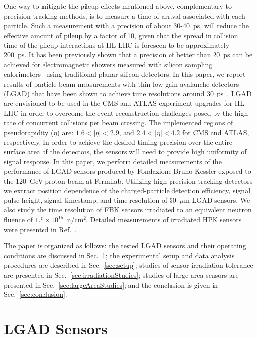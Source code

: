 \documentclass[preprint,1p]{elsarticle}
\begin{document}
One way to mitigate the pileup effects mentioned above, complementary to
precision tracking methods, is to measure a time of arrival 
associated with each particle. Such a measurement with a precision of about
30-40~\si{ps}, will reduce the effective amount of pileup by a factor of 10,
given that the spread in collision time of the pileup interactions at HL-LHC is
foreseen to be approximately 200~\si{ps}. It has been previously shown that a
precision of better than $20$~\si{ps} can be achieved for electromagnetic
showers measured with silicon sampling
calorimeters~\cite{Apresyan201662,Apresyan2017_NSSMIC,AKCHURIN201731} using
traditional planar silicon detectors. In this paper, we report results of
particle beam measurements with thin low-gain avalanche detectors (LGAD) that
have been shown to achieve time resolutions around
30~\si{ps}~\cite{Cartiglia201783, PELLEGRINI201412}. LGAD are envisioned to be
used in the CMS and ATLAS experiment upgrades for HL-LHC in order to overcome
the event reconstruction challenges posed by the high rate of concurrent
collisions per beam crossing. The implemented regions of pseudorapidity ($\eta$)
are: $1.6 < |\eta| < 2.9$, and $2.4 < |\eta| < 4.2 $ for CMS and ATLAS, respectively. In
order to achieve the desired timing precision over the entire surface area of the
detectors, the sensors will need to provide high uniformity of signal response. In this paper, we perform detailed measurements of the
performance of LGAD sensors produced by Fondazione Bruno Kessler exposed to the 120~GeV proton beam at
Fermilab. Utilizing high-precision tracking detectors we extract position
dependence of the charged-particle detection efficiency, signal pulse height,
signal timestamp, and time resolution of 50~$\mu$m LGAD sensors. We also study the time resolution of FBK sensors irradiated to an equivalent neutron fluence of $1.5\times 10^{15}$~n/cm$^2$. Detailed measurements of irradiated HPK sensors were presented in Ref.~\cite{Galloway:2017gfx}.

The paper is organized as follows: the tested LGAD sensors and
their operating conditions are discussed in Sec.~\ref{sec:sensors};
the experimental setup and data analysis
procedures are described in Sec.~\ref{sec:setup}; 
studies of sensor irradiation tolerance are presented in 
Sec.~\ref{sec:irradiationStudies}; studies of large area sensors are presented 
in Sec.~\ref{sec:largeAreaStudies}; and the conclusion is given in Sec.~\ref{sec:conclusion}.


\section{LGAD Sensors}
\label{sec:sensors}
\end{document}

